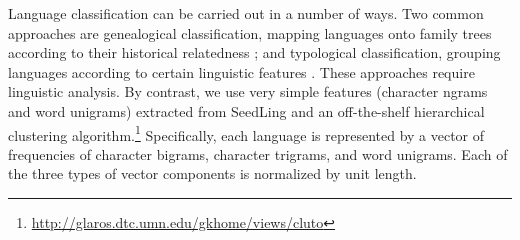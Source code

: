 Language classification can be carried out in a number of ways. Two common approaches are genealogical classification, mapping languages onto family trees according to their historical relatedness \cite{swadesh1952,starostin2010}; and typological classification, grouping languages according to certain linguistic features \cite{georgi2010wals,daume2009}. These approaches require linguistic analysis. By contrast, we use very simple features (character ngrams and word unigrams) extracted from SeedLing and an off-the-shelf hierarchical clustering algorithm.\footnote{\url{http://glaros.dtc.umn.edu/gkhome/views/cluto}} Specifically, each language is represented by a vector of frequencies of character bigrams, character trigrams, and word unigrams. Each of the three types of vector components is normalized by unit length.





